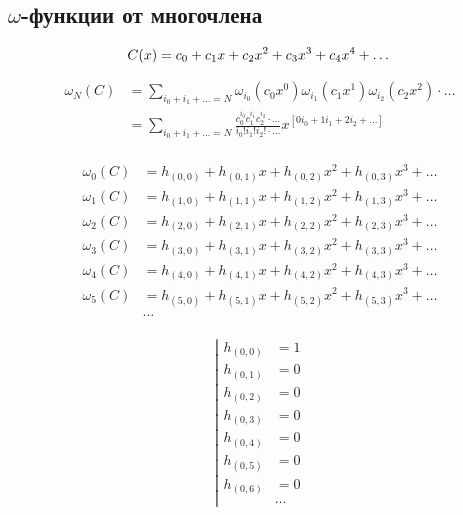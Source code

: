 
\subsection{$\omega$-функции от многочлена}

\begin{equation*}
C(x) = c_0 + c_1 x + c_2 x^2 + c_3 x^3 + c_4 x^4 + \ldots \\
\end{equation*}

\begin{equation*}\begin{aligned}
\omega_{N}(C) &= \sum_{i_0 + i_1 + \ldots = N}
{
  \omega_{i_0}(c_0 x^0)
  \omega_{i_1}(c_1 x^1)
  \omega_{i_2}(c_2 x^2)
  \cdot
  \ldots
} \\
&= \sum_{i_0 + i_1 + \ldots = N}
{
  \frac{c_0^{i_0} c_1^{i_1} c_2^{i_2} \cdot \ldots}{i_0! i_1! i_2! \cdot \ldots}
  x^{[0 i_0 + 1 i_1 + 2 i_2 + \ldots]}
} \\
\end{aligned}\end{equation*}

\begin{equation*} \begin{aligned}
\omega_{0}(C) &= h_{(0,0)} + h_{(0,1)} x + h_{(0,2)} x^2 + h_{(0,3)} x^3 + \ldots \\
\omega_{1}(C) &= h_{(1,0)} + h_{(1,1)} x + h_{(1,2)} x^2 + h_{(1,3)} x^3 + \ldots \\
\omega_{2}(C) &= h_{(2,0)} + h_{(2,1)} x + h_{(2,2)} x^2 + h_{(2,3)} x^3 + \ldots \\
\omega_{3}(C) &= h_{(3,0)} + h_{(3,1)} x + h_{(3,2)} x^2 + h_{(3,3)} x^3 + \ldots \\
\omega_{4}(C) &= h_{(4,0)} + h_{(4,1)} x + h_{(4,2)} x^2 + h_{(4,3)} x^3 + \ldots \\
\omega_{5}(C) &= h_{(5,0)} + h_{(5,1)} x + h_{(5,2)} x^2 + h_{(5,3)} x^3 + \ldots \\
&\ldots \\
\end{aligned} \end{equation*}

\begin{equation*} \left| \begin{aligned} 
h_{(0,0)} &= 1 \\ 
h_{(0,1)} &= 0 \\
h_{(0,2)} &= 0 \\
h_{(0,3)} &= 0 \\
h_{(0,4)} &= 0 \\
h_{(0,5)} &= 0 \\
h_{(0,6)} &= 0 \\
&\ldots
\end{aligned} \right. \end{equation*}

